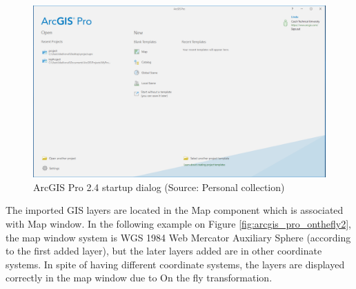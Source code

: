 \documentclass[a4paper,10pt,twoside]{article}
\begin{document}
\vspace{0.3cm}
\begin{figure}[hbt!] 
\begin{center}
\includegraphics[width=16cm]{../pictures/arcgis_startup_screen.png} 
\caption[ArcGIS Pro 2.4 startup dialog]{ArcGIS Pro 2.4 startup dialog (Source: Personal collection)}
\label{fig:arcgis_startup_screen}
\end{center}
\end{figure}

\noindent The imported GIS layers are located in the Map component which is associated with Map window. In the following example on Figure \ref{fig:arcgis_pro_onthefly2}, the map window system is WGS 1984 Web Mercator Auxiliary Sphere (according to the first added layer), but the later layers added are in other coordinate systems. In spite of having different coordinate systems, the layers are displayed correctly in the map window due to On the fly transformation.
\end{document}
